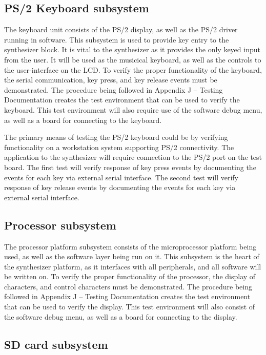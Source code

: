 \documentclass[abstract=on,paper=a4, fontsize=12pt]{scrartcl}		%
\begin{document}
  \subsection{PS/2 Keyboard subsystem}
    The keyboard unit consists of the PS/2 display, as well as the PS/2 driver running in software. This subsystem is used to provide key entry to the synthesizer block. It is vital to the synthesizer as it provides the only keyed input from the user. It will be used as the musicical keyboard, as well as the controls to the user-interface on the LCD. To verify the proper functionality of the keyboard, the serial communication, key press, and key release events must be demonstrated. The procedure being followed in Appendix J – Testing Documentation creates the test environment that can be used to verify the keyboard. This test environment will also require use of the software debug menu, as well as a board for connecting to the keyboard.\par
      The primary means of testing the PS/2 keyboard could be by verifying functionality on a workstation system supporting PS/2 connectivity. The application to the synthesizer will require connection to the PS/2 port on the test board. The first test will verify response of key press events by documenting the events for each key via external serial interface.  The second test will verify response of key release events by documenting the events for each key via external serial interface.\par
  \subsection{Processor subsystem}
    The processor platform subsystem consists of the microprocessor platform being used, as well as the software layer being run on it. This subsystem is the heart of the synthesizer platform, as it interfaces with all peripherals, and all software will be written on. To verify the proper functionality of the processor, the display of characters, and control characters must be demonstrated. The procedure being followed in Appendix J – Testing Documentation creates the test environment that can be used to verify the display. This test environment will also consist of the software debug menu, as well as a board for connecting to the display.\par
  \subsection{SD card subsystem}
    


\end{document}
